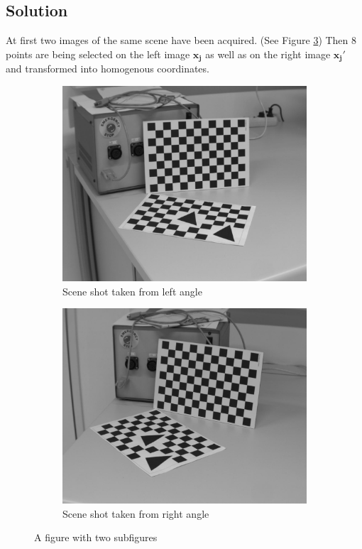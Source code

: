 \documentclass[
a4paper,     %
11pt         %
]{scrartcl}  %
\begin{document}
\subsection{Solution}

At first two images of the same scene have been acquired. (See Figure \ref{fig:acquired_images})
Then $8$ points are being selected on the left image $\mathbf{x_j}$ as well as on the right image $\mathbf{x_j'}$ and transformed into homogenous coordinates.

\begin{figure}[ht!]
\centering
\begin{subfigure}{.5\textwidth}
  \centering
  \includegraphics[scale=0.15]{Bildg_Messtechnik_Lab/FundamentalMatrix/img_left.jpg}
  \caption{Scene shot taken from left angle}
  \label{fig:sub1}
\end{subfigure}%
\begin{subfigure}{.5\textwidth}
  \centering
  \includegraphics[scale=0.15]{Bildg_Messtechnik_Lab/FundamentalMatrix/img_right.jpg}
  \caption{Scene shot taken from right angle}
  \label{fig:sub2}
\end{subfigure}
\caption{A figure with two subfigures}
\label{fig:acquired_images}
\end{figure}
\end{document}
